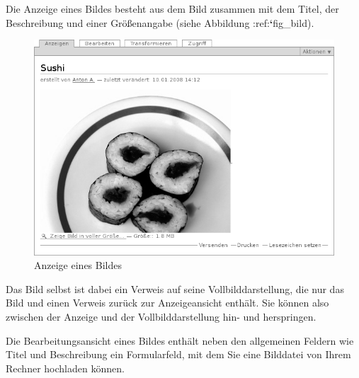 \documentclass[a4paper,12pt,ngerman]{manual}
\begin{document}
Die Anzeige eines Bildes besteht aus dem Bild zusammen mit dem
Titel, der Beschreibung und einer Größenangabe (siehe
Abbildung :ref:{\color{red}\bfseries{}{}`}fig\_bild).
\hypertarget{fig-bild}{}\begin{figure}[htbp]
\centering

\includegraphics{bild.png}
\caption{Anzeige eines Bildes}\end{figure}

Das Bild selbst ist dabei ein Verweis auf seine Vollbilddarstellung, die nur
das Bild und einen Verweis zurück zur Anzeigeansicht enthält. Sie können also
zwischen der Anzeige und der Vollbilddarstellung hin- und herspringen.

Die Bearbeitungsansicht eines Bildes enthält neben den allgemeinen
Feldern wie Titel und Beschreibung ein Formularfeld, mit dem Sie eine
Bilddatei von Ihrem Rechner hochladen können.
\end{document}
